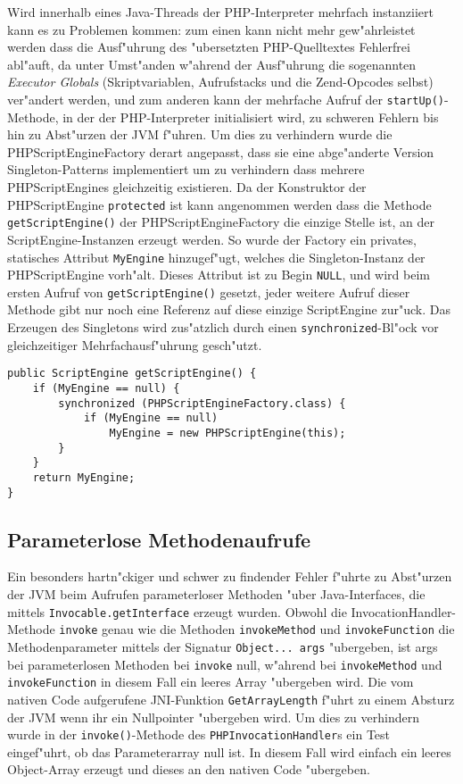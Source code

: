 Wird innerhalb eines Java-Threads der PHP-Interpreter mehrfach instanziiert kann es zu Problemen
kommen: zum einen kann nicht mehr gew"ahrleistet werden dass die Ausf"uhrung des "ubersetzten
PHP-Quelltextes Fehlerfrei abl"auft, da unter Umst"anden w"ahrend der Ausf"uhrung die sogenannten
\emph{Executor Globals} (Skriptvariablen, Aufrufstacks und die Zend-Opcodes selbst) ver"andert werden,
und zum anderen kann der mehrfache Aufruf der \texttt{startUp()}-Methode, in der der PHP-Interpreter
initialisiert wird, zu schweren Fehlern bis hin zu Abst"urzen der JVM f"uhren. Um dies zu verhindern
wurde die PHPScriptEngineFactory derart angepasst, dass sie eine abge"anderte Version Singleton-Patterns
implementiert um zu verhindern dass mehrere PHPScriptEngines gleichzeitig existieren. 
Da der Konstruktor der PHPScriptEngine \texttt{protected} ist kann angenommen werden dass die 
Methode \texttt{getScriptEngine()} der PHPScriptEngineFactory die einzige Stelle ist, an der
ScriptEngine-Instanzen erzeugt werden. So wurde der Factory ein privates, statisches Attribut \texttt{MyEngine} 
hinzugef"ugt, welches die Singleton-Instanz der PHPScriptEngine vorh"alt. Dieses Attribut ist zu Begin
\texttt{NULL}, und wird beim ersten Aufruf von \texttt{getScriptEngine()} gesetzt, jeder weitere Aufruf
dieser Methode gibt nur noch eine Referenz auf diese einzige ScriptEngine zur"uck. Das Erzeugen des
Singletons wird zus"atzlich durch einen \texttt{synchronized}-Bl"ock vor gleichzeitiger
Mehrfachausf"uhrung gesch"utzt.
\begin{lstlisting}[caption=Singleton-Erzeugung]
public ScriptEngine getScriptEngine() {
    if (MyEngine == null) {
        synchronized (PHPScriptEngineFactory.class) {
            if (MyEngine == null)
                MyEngine = new PHPScriptEngine(this);
        }
    }
    return MyEngine;
}
\end{lstlisting}

\subsection{Parameterlose Methodenaufrufe}
\label{sec:chap2:turp:params}

Ein besonders hartn"ckiger und schwer zu findender Fehler f"uhrte zu Abst"urzen der JVM beim Aufrufen
parameterloser Methoden "uber Java-Interfaces, die mittels \texttt{Invocable.getInterface} erzeugt wurden.
Obwohl die InvocationHandler-Methode \texttt{invoke} genau wie die Methoden \texttt{invokeMethod} und \texttt{invokeFunction}
die Methodenparameter mittels der Signatur \texttt{Object... args} "ubergeben, ist args bei parameterlosen Methoden
bei \texttt{invoke} null, w"ahrend bei \texttt{invokeMethod} und \texttt{invokeFunction} in diesem Fall ein leeres Array 
"ubergeben wird. Die vom nativen Code aufgerufene JNI-Funktion \texttt{GetArrayLength} f"uhrt zu einem Absturz der
JVM wenn ihr ein Nullpointer "ubergeben wird. Um dies zu verhindern wurde in der \texttt{invoke()}-Methode des
\texttt{PHPInvocationHandler}s ein Test eingef"uhrt, ob das Parameterarray null ist. In diesem Fall wird einfach
ein leeres Object-Array erzeugt und dieses an den nativen Code "ubergeben.

